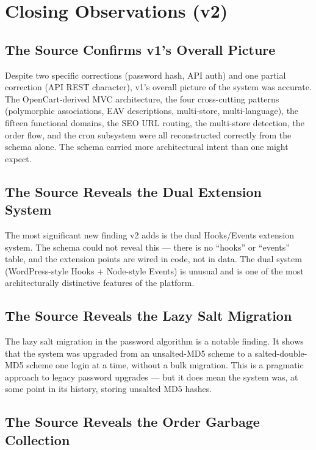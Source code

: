\documentclass[11pt,a4paper]{article}
\begin{document}
\section{Closing Observations (v2)}\label{sec:observations-v2}

\subsection{The Source Confirms v1's Overall Picture}

Despite two specific corrections (password hash, API auth) and one
partial correction (API REST character), v1's overall picture of
the system was accurate. The OpenCart-derived MVC architecture, the
four cross-cutting patterns (polymorphic associations, EAV
descriptions, multi-store, multi-language), the fifteen functional
domains, the SEO URL routing, the multi-store detection, the order
flow, and the cron subsystem were all reconstructed correctly from
the schema alone. The schema carried more architectural intent than
one might expect.

\subsection{The Source Reveals the Dual Extension System}

The most significant new finding v2 adds is the dual Hooks/Events
extension system. The schema could not reveal this --- there is no
``hooks'' or ``events'' table, and the extension points are wired
in code, not in data. The dual system (WordPress-style Hooks +
Node-style Events) is unusual and is one of the most architecturally
distinctive features of the platform.

\subsection{The Source Reveals the Lazy Salt Migration}

The lazy salt migration in the password algorithm is a notable
finding. It shows that the system was upgraded from an unsalted-MD5
scheme to a salted-double-MD5 scheme one login at a time, without a
bulk migration. This is a pragmatic approach to legacy password
upgrades --- but it does mean the system was, at some point in its
history, storing unsalted MD5 hashes.

\subsection{The Source Reveals the Order Garbage Collection}
\end{document}
